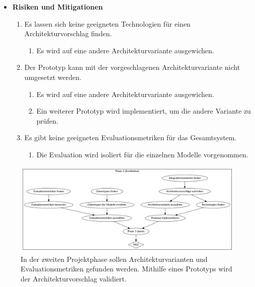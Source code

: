 \begin{itemize}
\begin{enumerate}
\begin{multicols}{2}
                \end{multicols}
        \end{enumerate}
    \item \textbf{Risiken und Mitigationen}
        \begin{enumerate}
            \item Es lassen sich keine geeigneten Technologien für einen Architekturvorschlag finden.
                \begin{enumerate}
                    \item Es wird auf eine andere Architekturvariante ausgewichen.
                \end{enumerate}
            \item Der Prototyp kann mit der vorgeschlagenen Architekturvariante nicht umgesetzt werden.
                \begin{enumerate}
                    \item Es wird auf eine andere Architekturvariante ausgewichen.
                    \item Ein weiterer Prototyp wird implementiert, um die andere Variante zu prüfen.
                \end{enumerate}
            \item Es gibt keine geeigneten Evaluationsmetriken für das Gesamtsystem.
                \begin{enumerate}
                    \item Die Evaluation wird isoliert für die einzelnen Modelle vorgenommen.
                \end{enumerate}
        \end{enumerate}
\end{itemize}

\begin{figure}
    \centering
    \includegraphics[width=\linewidth]{pics/phase2.png}
    \caption{In der zweiten Projektphase sollen Architekturvarianten und Evaluationsmetriken gefunden werden. Mithilfe eines Prototyps wird der Architekturvorschlag validiert.}
    \label{fig:projekt-phase2}
\end{figure}

